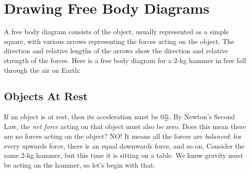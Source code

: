 
\section{Drawing Free Body Diagrams}

A free body diagram consists of the object, usually represented as a simple 
square, with various arrows representing the forces acting on the object. The 
direction and relative lengths of the arrows show the direction and relative 
strength of the forces. Here is a free body diagram for a 2-kg hammer in free fall 
through the air on Earth:

\begin{center}
\end{center}


\subsection{Objects At Rest}
If an object is at rest, then its acceleration must be $0 \frac{m}{s^2}$. By 
Newton's Second Law, the \textit{net force} acting on that object must also be 
zero. Does this mean there are no forces acting on the object? NO! It means all 
the forces are \textit{balanced}: for every upwards force, there is an equal 
downwards force, and so on. Consider the same 2-kg hammer, but this time it is 
sitting on a table. We know gravity must be acting on the hammer, so let's begin 
with that:

